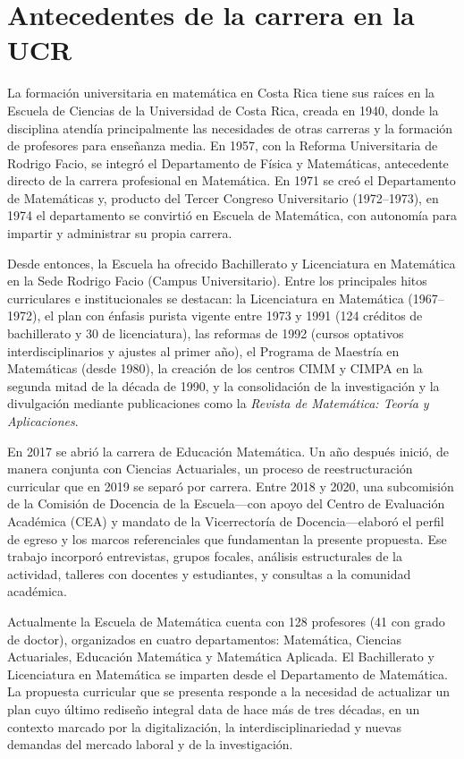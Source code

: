 
\section{Antecedentes de la carrera en la UCR}

La formación universitaria en matemática en Costa Rica tiene sus raíces en la Escuela de Ciencias de la Universidad de Costa Rica, creada en 1940, donde la disciplina atendía principalmente las necesidades de otras carreras y la formación de profesores para enseñanza media. En 1957, con la Reforma Universitaria de Rodrigo Facio, se integró el Departamento de Física y Matemáticas, antecedente directo de la carrera profesional en Matemática. En 1971 se creó el Departamento de Matemáticas y, producto del Tercer Congreso Universitario (1972--1973), en 1974 el departamento se convirtió en Escuela de Matemática, con autonomía para impartir y administrar su propia carrera.

Desde entonces, la Escuela ha ofrecido Bachillerato y Licenciatura en Matemática en la Sede Rodrigo Facio (Campus Universitario). Entre los principales hitos curriculares e institucionales se destacan: la Licenciatura en Matemática (1967--1972), el plan con énfasis purista vigente entre 1973 y 1991 (124 créditos de bachillerato y 30 de licenciatura), las reformas de 1992 (cursos optativos interdisciplinarios y ajustes al primer año), el Programa de Maestría en Matemáticas (desde 1980), la creación de los centros CIMM y CIMPA en la segunda mitad de la década de 1990, y la consolidación de la investigación y la divulgación mediante publicaciones como la \emph{Revista de Matemática: Teoría y Aplicaciones}.

En 2017 se abrió la carrera de Educación Matemática. Un año después inició, de manera conjunta con Ciencias Actuariales, un proceso de reestructuración curricular que en 2019 se separó por carrera. Entre 2018 y 2020, una subcomisión de la Comisión de Docencia de la Escuela---con apoyo del Centro de Evaluación Académica (CEA) y mandato de la Vicerrectoría de Docencia---elaboró el perfil de egreso y los marcos referenciales que fundamentan la presente propuesta. Ese trabajo incorporó entrevistas, grupos focales, análisis estructurales de la actividad, talleres con docentes y estudiantes, y consultas a la comunidad académica.

Actualmente la Escuela de Matemática cuenta con 128 profesores (41 con grado de doctor), organizados en cuatro departamentos: Matemática, Ciencias Actuariales, Educación Matemática y Matemática Aplicada. El Bachillerato y Licenciatura en Matemática se imparten desde el Departamento de Matemática. La propuesta curricular que se presenta responde a la necesidad de actualizar un plan cuyo último rediseño integral data de hace más de tres décadas, en un contexto marcado por la digitalización, la interdisciplinariedad y nuevas demandas del mercado laboral y de la investigación.

